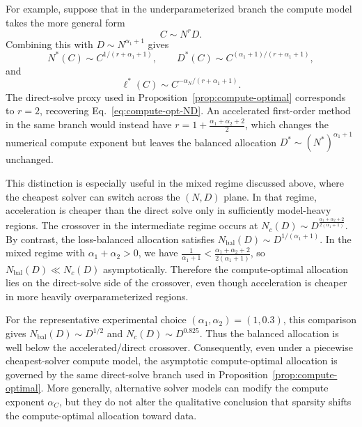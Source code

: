 \documentclass[11pt]{article}
\theoremstyle{plain}
\theoremstyle{definition}
\theoremstyle{remark}
\begin{document}
For example, suppose that in the underparameterized branch the compute model takes the more general form
\begin{equation}
C \sim N^rD .
\end{equation}
Combining this with $D\sim N^{\alpha_1+1}$ gives
\begin{equation}
N^*(C)\sim C^{1/(r+\alpha_1+1)},
\qquad
D^*(C)\sim C^{(\alpha_1+1)/(r+\alpha_1+1)},
\end{equation}
and
\begin{equation}
\ell^*(C)\sim C^{-\alpha_N/(r+\alpha_1+1)}.
\end{equation}
The direct-solve proxy used in Proposition~\ref{prop:compute-optimal} corresponds to $r=2$, recovering Eq.~\eqref{eq:compute-opt-ND}. An accelerated first-order method in the same branch would instead have $r=1+\frac{\alpha_1+\alpha_2+2}{2}$,
which changes the numerical compute exponent but leaves the balanced allocation
$D^*\sim (N^*)^{\alpha_1+1}$ unchanged.

This distinction is especially useful in the mixed regime discussed above, where the cheapest solver can switch across the $(N,D)$ plane. In that regime, acceleration is cheaper than the direct solve only in sufficiently model-heavy regions. The crossover in the intermediate regime occurs at $N_c(D)\sim D^{\frac{\alpha_1+\alpha_2+2}{2(\alpha_1+1)}}$.
By contrast, the loss-balanced allocation satisfies $N_{\mathrm{bal}}(D)\sim D^{1/(\alpha_1+1)}$. In the mixed regime with $\alpha_1+\alpha_2>0$, we have $\frac{1}{\alpha_1+1} < \frac{\alpha_1+\alpha_2+2}{2(\alpha_1+1)}$,
so $N_{\mathrm{bal}}(D)\ll N_c(D)$ asymptotically. Therefore the compute-optimal allocation lies on the direct-solve side of the crossover, even though acceleration is cheaper in more heavily overparameterized regions.

For the representative experimental choice $(\alpha_1,\alpha_2)=(1,0.3)$, this comparison gives
$N_{\mathrm{bal}}(D)\sim D^{1/2}$ and $N_c(D)\sim D^{0.825}$. Thus the balanced allocation is well below the accelerated/direct crossover. Consequently, even under a piecewise cheapest-solver compute model, the asymptotic compute-optimal allocation is governed by the same direct-solve branch used in Proposition~\ref{prop:compute-optimal}. More generally, alternative solver models can modify the compute exponent $\alpha_C$, but they do not alter the qualitative conclusion that sparsity shifts the compute-optimal allocation toward data.
\end{document}
